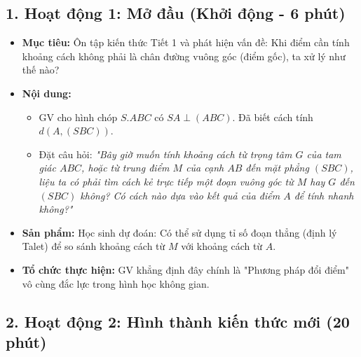 \documentclass[12pt, a4paper]{article}
\begin{document}
\subsection*{1. Hoạt động 1: Mở đầu (Khởi động - 6 phút)}

\begin{itemize}[leftmargin=1.2cm]
    \item[a)] \textbf{Mục tiêu:} Ôn tập kiến thức Tiết 1 và phát hiện vấn đề: Khi điểm cần tính khoảng cách không phải là chân đường vuông góc (điểm gốc), ta xử lý như thế nào?
    \item[b)] \textbf{Nội dung:}
    \begin{itemize}[leftmargin=0.6cm]
        \item GV cho hình chóp $S.ABC$ có $SA \perp (ABC)$. Đã biết cách tính $d(A, (SBC))$.
        \item Đặt câu hỏi: \textit{"Bây giờ muốn tính khoảng cách từ trọng tâm $G$ của tam giác $ABC$, hoặc từ trung điểm $M$ của cạnh $AB$ đến mặt phẳng $(SBC)$, liệu ta có phải tìm cách kẻ trực tiếp một đoạn vuông góc từ $M$ hay $G$ đến $(SBC)$ không? Có cách nào dựa vào kết quả của điểm $A$ để tính nhanh không?"}
    \end{itemize}

    \item[c)] \textbf{Sản phẩm:} Học sinh dự đoán: Có thể sử dụng tỉ số đoạn thẳng (định lý Talet) để so sánh khoảng cách từ $M$ với khoảng cách từ $A$.
    \item[d)] \textbf{Tổ chức thực hiện:} GV khẳng định đây chính là "Phương pháp đổi điểm" vô cùng đắc lực trong hình học không gian.
\end{itemize}

\subsection*{2. Hoạt động 2: Hình thành kiến thức mới (20 phút)}
\end{document}
